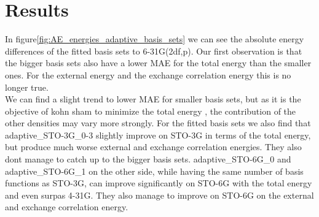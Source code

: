 \section{Results}
In figure\ref{fig:AE_energies_adaptive_basis_sets} we can see the absolute energy differences of the fitted basis sets to 6-31G(2df,p).
Our first observation is that the bigger basis sets also have a lower MAE for the total energy than the smaller ones.
For the external energy and the exchange correlation energy this is no longer true. \\
We can find a slight trend to lower MAE for smaller basis sets, but as it is the objective of kohn sham to minimize the total energy , the contribution of the other densities may vary more strongly.
For the fitted basis sets we also find that adaptive\_STO-3G\_0-3 slightly improve on STO-3G in terms of the total energy, but produce much worse external and exchange correlation energies.
They also dont manage to catch up to the bigger basis sets. adaptive\_STO-6G\_0 and adaptive\_STO-6G\_1 on the other side, while having the same number of basis functions as STO-3G, can improve significantly on STO-6G with the total energy and even surpas 4-31G. They also manage to improve on STO-6G on the external and exchange correlation energy.\\
